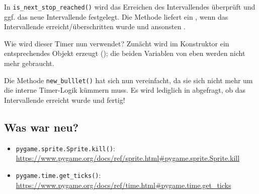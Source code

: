 In \texttt{is\_next\_stop\_reached()} wird das Erreichen des Intervallendes überprüft und ggf. das neue Intervallende festgelegt. Die Methode liefert ein \true, wenn das Intervallende erreicht/überschritten wurde und ansonsten \false.


Wie wird dieser Timer nun verwendet? Zunächt wird im Konstruktor ein entsprechendes Objekt erzeugt (); die beiden Variablen von eben werden nicht mehr gebraucht.


Die Methode \texttt{new\_bulllet()} hat sich nun vereinfacht, da sie sich nicht mehr um die interne Timer-Logik kümmern muss. Es wird lediglich in  abgefragt, ob das Intervallende erreicht wurde und fertig!



\subsection*{Was war neu?}

\begin{itemize}
	\item \texttt{pygame.sprite.Sprite.kill()}:
	\\ 
    \url{https://www.pygame.org/docs/ref/sprite.html#pygame.sprite.Sprite.kill}

	\item \texttt{pygame.time.get\_ticks()}:
	\\ 
    \url{https://www.pygame.org/docs/ref/time.html#pygame.time.get_ticks}
	
\end{itemize}

